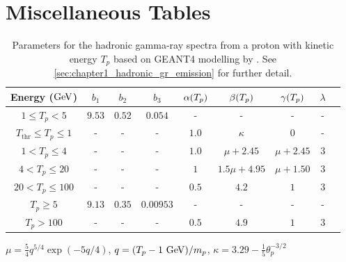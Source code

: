 \chapter{Miscellaneous Tables} \label{A6_misc}

\begin{table}[h!]
    \centering
    \begin{threeparttable}
   \begin{tabular}{ccccccccc}
        \hline
        Energy ($\si{\giga\electronvolt}$)  & $b_1$ & $b_2$ & $b_3$ & $\alpha\qty(T_p)$ & $\beta\qty(T_p)$ & $\gamma\qty(T_p)$ & $\lambda$ \\
        \hline 
         $1\leq T_p < 5$ & $9.53$ & $0.52$ & $0.054$ & - & - & - & - \\
         $T_\text{thr} \leq T_p \leq 1$ & - & - & - & $1.0$ & $\kappa$ & 0 & - \\
         $1 < T_p \leq 4$ & - & - & - & $1.0$ & $\mu+2.45$ & $\mu+2.45$ & $3$ \\
         $4 < T_p \leq 20$ & - & - & - & $1$ & $1.5\mu+4.95$ & $\mu+1.50$ & $3$ \\
         $20 < T_p \leq 100$ & - & - & - & $0.5$ & $4.2$ & $1$ & $3$ \\
         $T_p \geq 5$ & $9.13$ & $0.35$ & $0.00953$ & - & - & - & - \\
         $T_p > 100$ & - & - & - & $0.5$ & $4.9$ & $1$ & $3$ \\
         \hline
    \end{tabular}
    \begin{tablenotes}
    \item $\mu=\frac{5}{4}q^{5/4}\exp(-5q/4)$, $q=\qty(T_p-1~\si{\giga\electronvolt})/m_p$, $\kappa=3.29-\frac{1}{5}\theta_p^{-3/2}$
    \end{tablenotes}
    \caption{Parameters for the hadronic gamma-ray spectra from a proton with kinetic energy $T_p$ based on GEANT4 modelling by \cite{2014PhRvD..90l3014K}. See \autoref{sec:chapter1_hadronic_gr_emission}
    for further detail.}
    \label{tab:chapter1_Kafexhio}
    \end{threeparttable}
\end{table}